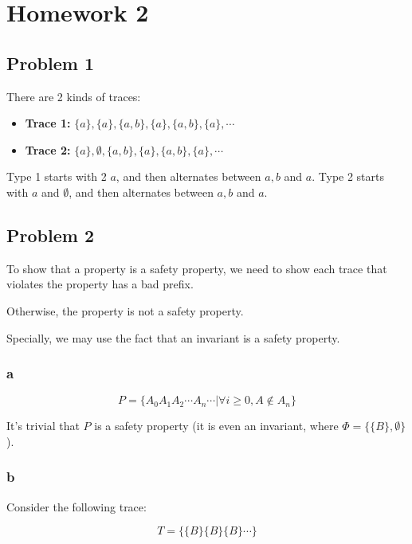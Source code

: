 \chapter{Homework 2}

\section{Problem 1}

There are 2 kinds of traces:

\begin{itemize}
    \item \textbf{Trace 1:} $\{a\}, \{a\}, \{a, b\}, \{a\}, \{a, b\}, \{a\}, \cdots$
    \item \textbf{Trace 2:} $\{a\}, \emptyset, \{a, b\}, \{a\}, \{a, b\}, \{a\}, \cdots$
\end{itemize}

Type 1 starts with 2 $a$, and then alternates between $a, b$ and $a$.
Type 2 starts with $a$ and $\emptyset$, and then alternates between $a, b$ and $a$.

\section{Problem 2}

To show that a property is a safety property, we need to show each trace that violates the property has a bad prefix.

Otherwise, the property is not a safety property.

Specially, we may use the fact that an invariant is a safety property.

\subsection{a}

\newcommand{\A}{\{A\}}
\newcommand{\B}{\{B\}}

$$
P = \{A_0 A_1 A_2 \cdots A_n \cdots | \forall i \ge 0,  A \notin A_n \}
$$

It's trivial that $P$ is a safety property (it is even an invariant, where $\Phi = \{\B, \emptyset \}$).

\subsection{b}

Consider the following trace:

$$
T = \{\B \B \B \cdots \}
$$

